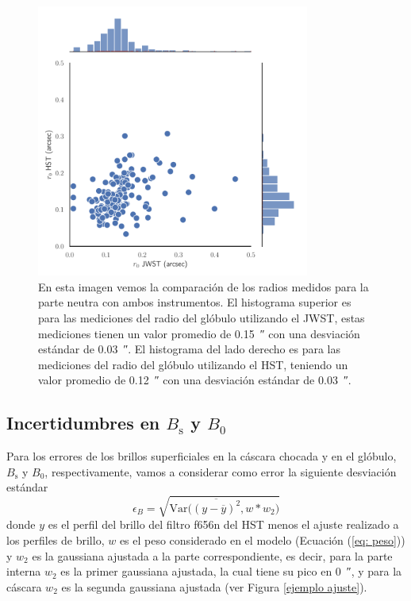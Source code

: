 \documentclass{book}
\begin{document}
\begin{figure}[htb]
    \centering
    \includegraphics[width=0.8\textwidth]{imagenes_corregidas/r_0.pdf}
    \caption{En esta imagen vemos la comparación de los radios medidos
      para la parte neutra con ambos instrumentos. El histograma
      superior es para las mediciones del radio del glóbulo utilizando
      el JWST, estas mediciones tienen un valor promedio de
      \SI{0.15}{\arcsecond} con una desviación estándar de
      \SI{0.03}{\arcsecond}. El histograma del lado derecho es para
      las mediciones del radio del glóbulo utilizando el HST, teniendo
      un valor promedio de \SI{0.12}{\arcsecond} con una desviación
      estándar de \SI{0.03}{\arcsecond}. }
    \label{fig:Rcore dis}
\end{figure}

\subsection{\boldmath Incertidumbres en $B_\mathrm{s}$ y $B_0$}

Para los errores de los brillos superficiales en la cáscara chocada y
en el glóbulo, $B_\mathrm{s}$ y $B_0$, respectivamente, vamos a
considerar como error la siguiente desviación estándar
\begin{equation}
  \epsilon_{B}=\sqrt{\mathrm{Var}\Big(\overline{(y-\overline{y})^2},w*w_2\Big)} 
\end{equation} 
donde $y$ es el perfil del brillo del filtro f656n del HST menos el
ajuste realizado a los perfiles de brillo, $w$ es el peso considerado
en el modelo (Ecuación (\ref{eq: peso})) y $w_2$ es la gaussiana
ajustada a la parte correspondiente, es decir, para la parte interna
$w_2$ es la primer gaussiana ajustada, la cual tiene su pico en
\SI{0}{\arcsecond}, y para la cáscara $w_2$ es la segunda gaussiana
ajustada (ver Figura \ref{ejemplo ajuste}).
\end{document}
